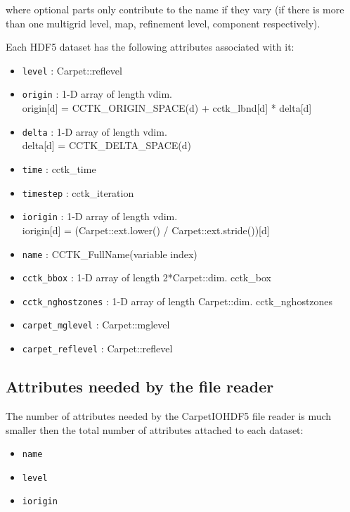 where optional parts only contribute to the name if they vary (if there is
more than one multigrid level, map, refinement level, component respectively).

Each HDF5 dataset has the following attributes associated with it:

\begin{itemize}
  \item {\tt level} : Carpet::reflevel
  \item {\tt origin} : 1-D array of length vdim. \\
        origin[d] = CCTK\_ORIGIN\_SPACE(d) + cctk\_lbnd[d] * delta[d]
  \item {\tt delta} : 1-D array of length vdim. \\
        delta[d] = CCTK\_DELTA\_SPACE(d)
  \item {\tt time} : cctk\_time
  \item {\tt timestep} : cctk\_iteration
  \item {\tt iorigin} : 1-D array of length vdim. \\ iorigin[d] = (Carpet::ext.lower() / Carpet::ext.stride())[d]
  \item {\tt name} : CCTK\_FullName(variable index)
  \item {\tt cctk\_bbox} : 1-D array of length 2*Carpet::dim. cctk\_box
  \item {\tt cctk\_nghostzones} : 1-D array of length Carpet::dim. cctk\_nghostzones
  \item {\tt carpet\_mglevel} : Carpet::mglevel
  \item {\tt carpet\_reflevel} : Carpet::reflevel
\end{itemize}


\subsection{Attributes needed by the file reader}

The number of attributes needed by the CarpetIOHDF5 file reader is much smaller then the total
number of attributes attached to each dataset:

\begin{itemize}
  \item {\tt name}
  \item {\tt level}
  \item {\tt iorigin}
\end{itemize}


